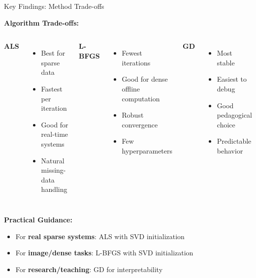 \documentclass[aspectratio=169,usenames,dvipsnames]{beamer}
\begin{document}
\begin{frame}{Key Findings: Method Trade-offs}

\textbf{Algorithm Trade-offs:}

\vspace{0.3cm}

\begin{columns}[T]
\textbf{ALS}
\begin{itemize}
  \item Best for sparse data
  \item Fastest per iteration
  \item Good for real-time systems
  \item Natural missing-data handling
\end{itemize}

\textbf{L-BFGS}
\begin{itemize}
  \item Fewest iterations
  \item Good for dense offline computation
  \item Robust convergence
  \item Few hyperparameters
\end{itemize}

\textbf{GD}
\begin{itemize}
  \item Most stable
  \item Easiest to debug
  \item Good pedagogical choice
  \item Predictable behavior
\end{itemize}
\end{columns}

\vspace{0.5cm}

\textbf{Practical Guidance:}
\begin{itemize}
  \item For \textbf{real sparse systems}: ALS with SVD initialization
  \item For \textbf{image/dense tasks}: L-BFGS with SVD initialization
  \item For \textbf{research/teaching}: GD for interpretability
\end{itemize}

\end{frame}
\end{document}
